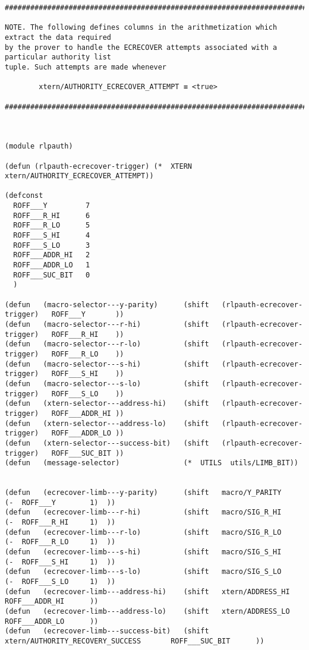 \documentclass[varwidth=\maxdimen,margin=0.5cm,multi={verbatim}]{standalone}
\begin{document}
\begin{verbatim}
##########################################################################################

NOTE. The following defines columns in the arithmetization which extract the data required
by the prover to handle the ECRECOVER attempts associated with a particular authority list
tuple. Such attempts are made whenever

        xtern/AUTHORITY_ECRECOVER_ATTEMPT ≡ <true>

##########################################################################################



(module rlpauth)

(defun (rlpauth-ecrecover-trigger) (*  XTERN  xtern/AUTHORITY_ECRECOVER_ATTEMPT))

(defconst
  ROFF___Y         7
  ROFF___R_HI      6
  ROFF___R_LO      5
  ROFF___S_HI      4
  ROFF___S_LO      3
  ROFF___ADDR_HI   2
  ROFF___ADDR_LO   1
  ROFF___SUC_BIT   0
  )

(defun   (macro-selector---y-parity)      (shift   (rlpauth-ecrecover-trigger)   ROFF___Y       ))
(defun   (macro-selector---r-hi)          (shift   (rlpauth-ecrecover-trigger)   ROFF___R_HI    ))
(defun   (macro-selector---r-lo)          (shift   (rlpauth-ecrecover-trigger)   ROFF___R_LO    ))
(defun   (macro-selector---s-hi)          (shift   (rlpauth-ecrecover-trigger)   ROFF___S_HI    ))
(defun   (macro-selector---s-lo)          (shift   (rlpauth-ecrecover-trigger)   ROFF___S_LO    ))
(defun   (xtern-selector---address-hi)    (shift   (rlpauth-ecrecover-trigger)   ROFF___ADDR_HI ))
(defun   (xtern-selector---address-lo)    (shift   (rlpauth-ecrecover-trigger)   ROFF___ADDR_LO ))
(defun   (xtern-selector---success-bit)   (shift   (rlpauth-ecrecover-trigger)   ROFF___SUC_BIT ))
(defun   (message-selector)               (*  UTILS  utils/LIMB_BIT))


(defun   (ecrecover-limb---y-parity)      (shift   macro/Y_PARITY                     (-  ROFF___Y        1)  ))
(defun   (ecrecover-limb---r-hi)          (shift   macro/SIG_R_HI                     (-  ROFF___R_HI     1)  ))
(defun   (ecrecover-limb---r-lo)          (shift   macro/SIG_R_LO                     (-  ROFF___R_LO     1)  ))
(defun   (ecrecover-limb---s-hi)          (shift   macro/SIG_S_HI                     (-  ROFF___S_HI     1)  ))
(defun   (ecrecover-limb---s-lo)          (shift   macro/SIG_S_LO                     (-  ROFF___S_LO     1)  ))
(defun   (ecrecover-limb---address-hi)    (shift   xtern/ADDRESS_HI                       ROFF___ADDR_HI      ))
(defun   (ecrecover-limb---address-lo)    (shift   xtern/ADDRESS_LO                       ROFF___ADDR_LO      ))
(defun   (ecrecover-limb---success-bit)   (shift   xtern/AUTHORITY_RECOVERY_SUCCESS       ROFF___SUC_BIT      ))



\end{verbatim}
\end{document}

